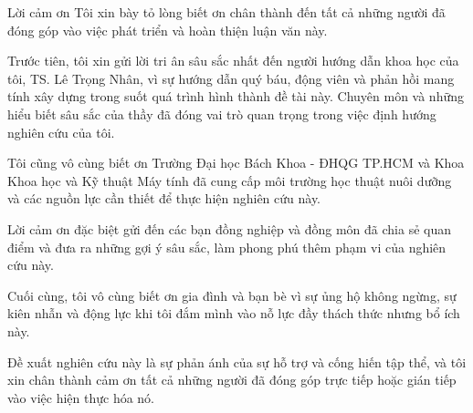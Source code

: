 \begin{preface}{Lời cảm ơn}
  Tôi xin bày tỏ lòng biết ơn chân thành đến tất cả những người đã đóng góp vào việc phát triển và hoàn thiện luận văn này.

  Trước tiên, tôi xin gửi lời tri ân sâu sắc nhất đến người hướng dẫn khoa học của tôi, TS. Lê Trọng Nhân, vì sự hướng dẫn quý báu, động viên và phản hồi mang tính xây dựng trong suốt quá trình hình thành đề tài này. Chuyên môn và những hiểu biết sâu sắc của thầy đã đóng vai trò quan trọng trong việc định hướng nghiên cứu của tôi.

  Tôi cũng vô cùng biết ơn Trường Đại học Bách Khoa - ĐHQG TP.HCM và Khoa Khoa học và Kỹ thuật Máy tính đã cung cấp môi trường học thuật nuôi dưỡng và các nguồn lực cần thiết để thực hiện nghiên cứu này.

  Lời cảm ơn đặc biệt gửi đến các bạn đồng nghiệp và đồng môn đã chia sẻ quan điểm và đưa ra những gợi ý sâu sắc, làm phong phú thêm phạm vi của nghiên cứu này.

  Cuối cùng, tôi vô cùng biết ơn gia đình và bạn bè vì sự ủng hộ không ngừng, sự kiên nhẫn và động lực khi tôi đắm mình vào nỗ lực đầy thách thức nhưng bổ ích này.

  Đề xuất nghiên cứu này là sự phản ánh của sự hỗ trợ và cống hiến tập thể, và tôi xin chân thành cảm ơn tất cả những người đã đóng góp trực tiếp hoặc gián tiếp vào việc hiện thực hóa nó.
\end{preface}
